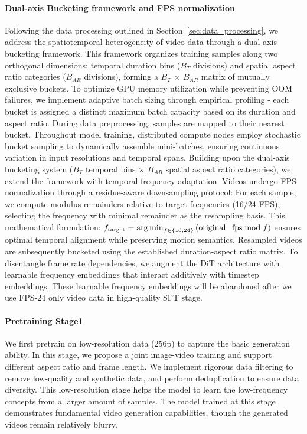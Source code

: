 \documentclass{article}
\newcommand{\argmin}{\operatornamewithlimits{arg\,min}}
\begin{document}
{\paragraph{Dual-axis Bucketing framework and FPS normalization}
Following the data processing outlined in Section~\ref{sec:data_processing}, we address the spatiotemporal heterogeneity of video data through a dual-axis bucketing framework. This framework organizes training samples along two orthogonal dimensions: temporal duration bins ($B_T$ divisions) and spatial aspect ratio categories ($B_{AR}$ divisions), forming a $B_T$ × $B_{AR}$ matrix of mutually exclusive buckets. To optimize GPU memory utilization while preventing OOM failures, we implement adaptive batch sizing through empirical profiling - each bucket is assigned a distinct maximum batch capacity based on its duration and aspect ratio. During data preprocessing, samples are mapped to their nearest bucket. Throughout model training, distributed compute nodes employ stochastic bucket sampling to dynamically assemble mini-batches, ensuring continuous variation in input resolutions and temporal spans. Building upon the dual-axis bucketing system ($B_T$ temporal bins × $B_{AR}$ spatial aspect ratio categories), we extend the framework with temporal frequency adaptation. Videos undergo FPS normalization through a residue-aware downsampling protocol: For each sample, we compute modulus remainders relative to target frequencies (16/24 FPS), selecting the frequency with minimal remainder as the resampling basis. This mathematical formulation:
$f_{\mathrm{target}} = \argmin_{f \in \{16,24\}} \left( \mathrm{original\_fps} \bmod f \right)$
ensures optimal temporal alignment while preserving motion semantics. Resampled videos are subsequently bucketed using the established duration-aspect ratio matrix. To disentangle frame rate dependencies, we augment the DiT architecture with learnable frequency embeddings that interact additively with timestep embeddings. These learnable frequency embeddings will be abandoned after we use FPS-24 only video data in high-quality SFT stage.
\paragraph{Pretraining Stage1}
We first pretrain on low-resolution data (256p) to capture the basic generation ability. In this stage, we propose a joint image-video training and support different aspect ratio and frame length. We implement rigorous data filtering to remove low-quality and synthetic data, and perform deduplication to ensure data diversity. This low-resolution stage helps the model to learn the low-frequency concepts from a larger amount of samples. The model trained at this stage demonstrates fundamental video generation capabilities, though the generated videos remain relatively blurry.
}
\end{document}
